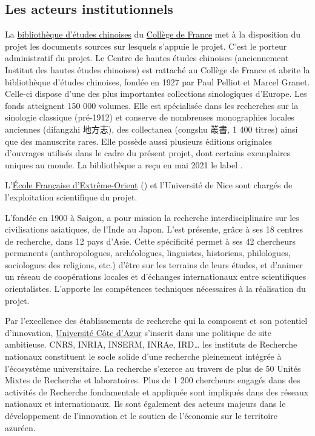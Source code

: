 \subsection*{Les acteurs institutionnels}
La \href{https://www.college-de-france.fr/fr/bibliotheque-archives/bibliotheque-etudes-chinoises}{bibliothèque d’études chinoises} du \href{https://www.college-de-france.fr/fr}{Collège de France} met à la disposition du projet les documents sources sur lesquels s’appuie le projet. C’est le porteur administratif du projet. Le Centre de hautes études chinoises (anciennement Institut des hautes études chinoises) est rattaché au Collège de France et abrite la bibliothèque d'études chinoises, fondée en 1927 par Paul Pelliot et Marcel Granet. Celle-ci dispose d’une des plus importantes collections sinologiques d’Europe. Les fonds atteignent 150 000 volumes. Elle est spécialisée dans les recherches sur la sinologie classique (pré-1912) et conserve de nombreuses monographies locales anciennes (difangzhi 地方志), des collectanea (congshu 叢書, 1 400 titres) ainsi que des manuscrits rares. Elle possède aussi plusieurs éditions originales d’ouvrages utilisés dans le cadre du présent projet, dont certains exemplaires uniques au monde. La bibliothèque a reçu en mai 2021 le label \CollEx.

L’\href{https://www.efeo.fr/index.php}{École Française d’Extrême-Orient} (\EFEO) et l’Université de Nice sont chargés de l’exploitation scientifique du projet. 

L’\EFEO fondée en 1900 à Saigon, a pour mission la recherche interdisciplinaire sur les civilisations asiatiques, de l'Inde au Japon. L'\EFEO est présente, grâce à ses 18 centres de recherche, dans 12 pays d'Asie. Cette spécificité permet à ses 42 chercheurs permanents (anthropologues, archéologues, linguistes, historiens, philologues, sociologues des religions, etc.) d'être sur les terrains de leurs études, et d'animer un réseau de coopérations locales et d'échanges internationaux entre scientifiques orientalistes. L’\EFEO apporte les compétences techniques nécessaires à la réalisation du projet. 

Par l’excellence des établissements de recherche qui la composent et son potentiel d’innovation, \href{https://univ-cotedazur.fr/recherche-innovation}{Université Côte d’Azur} s’inscrit dans une politique de site ambitieuse. CNRS, INRIA, INSERM, INRAe, IRD… les instituts de Recherche nationaux constituent le socle solide d’une recherche pleinement intégrée à l’écosystème universitaire. La recherche s’exerce au travers de plus de 50 Unités Mixtes de Recherche et laboratoires. Plus de 1 200 chercheurs engagés dans des activités de Recherche fondamentale et appliquée sont impliqués dans des réseaux nationaux et internationaux. Ils sont également des acteurs majeurs dans le développement de l’innovation et le soutien de l’économie sur le territoire azuréen.

